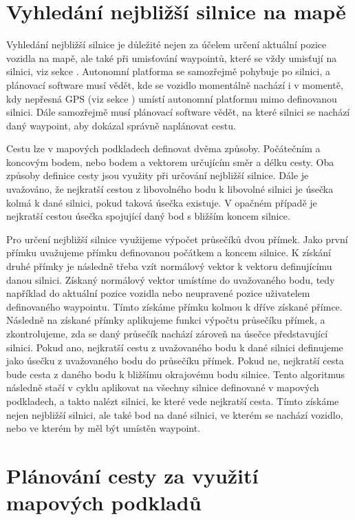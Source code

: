 \documentclass[czech, bachelor]{diploma}
\begin{document}
\section{Vyhledání nejbližší silnice na mapě}

Vyhledání nejbližší silnice je důležité nejen za účelem určení aktuální pozice vozidla na mapě, ale také při umisťování waypointů,
které se vždy umisťují na silnici, viz sekce . Autonomní platforma se samozřejmě pohybuje po silnici,
a plánovací software musí vědět, kde se vozidlo momentálně nachází i v momentě, kdy nepřesná GPS (viz sekce
) umístí autonomní platformu mimo definovanou silnici. Dále samozřejmě musí plánovací software vědět,
na které silnici se nachází daný waypoint, aby dokázal správně naplánovat cestu.

Cestu lze v mapových podkladech definovat dvěma způsoby. Počátečním a koncovým bodem, nebo bodem a vektorem určujícím směr a délku
cesty. Oba způsoby definice cesty jsou využity při určování nejbližší silnice. Dále je uvažováno, že nejkratší cestou
z libovolného bodu k libovolné silnici je úsečka kolmá k dané silnici, pokud taková úsečka existuje. V opačném případě
je nejkratší cestou úsečka spojující daný bod s bližším koncem silnice.

Pro určení nejbližší silnice využijeme výpočet průsečíků dvou přímek. %
Jako první přímku uvažujeme přímku definovanou počátkem a koncem silnice. K získání druhé přímky je následně třeba vzít normálový
vektor k vektoru definujícímu danou silnici. Získaný normálový vektor umístíme do uvažovaného bodu, tedy například do aktuální
pozice vozidla nebo neupravené pozice uživatelem definovaného waypointu. Tímto získáme přímku kolmou k dříve získané přímce.
Následně na získané přímky aplikujeme funkci výpočtu průsečíku přímek, a zkontrolujeme, zda se daný průsečík nachází zároveň
na úsečce představující silnici. Pokud ano, nejkratší cestu z uvažovaného bodu k dané silnici definujeme jako úsečku z uvažovaného
bodu do průsečíku přímek. Pokud ne, nejkratší cesta bude cesta z daného bodu k bližšímu okrajovému bodu silnice. Tento algoritmus
následně stačí v cyklu aplikovat na všechny silnice definované v mapových podkladech, a takto nalézt silnici, ke které vede
nejkratší cesta. Tímto získáme nejen nejbližší silnici, ale také bod na dané silnici, ve kterém se nachází vozidlo, nebo ve kterém
by měl být umístěn waypoint.

\section{Plánování cesty za využití mapových podkladů}
\end{document}
